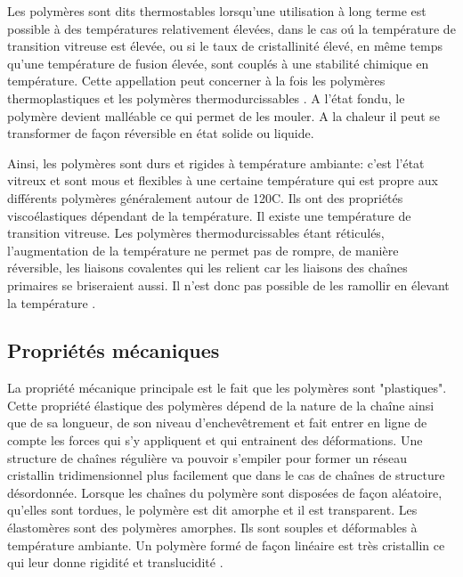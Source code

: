 \par{
Les polym\`eres sont dits thermostables lorsqu'une utilisation \`a long terme est possible \`a des temp\'eratures relativement \'elev\'ees, dans le cas o\'u la temp\'erature de transition vitreuse est \'elev\'ee, ou si le taux de cristallinit\'e \'elev\'e, en m\^eme temps qu'une temp\'erature de fusion \'elev\'ee, sont coupl\'es \`a une stabilit\'e chimique en temp\'erature. Cette appellation peut concerner \`a la fois les polym\`eres thermoplastiques et les polym\`eres thermodurcissables {\citep{domin2013}}. A l'\'etat fondu, le polym\`ere devient mall\'eable ce qui permet de les mouler. A la chaleur il peut se transformer de fa\c con r\'eversible en \'etat solide ou liquide.
}
\par{
Ainsi, les polym\`eres sont durs et rigides \`a temp\'erature ambiante: c'est l'\'etat vitreux et sont mous et flexibles \`a une certaine temp\'erature qui est propre aux diff\'erents polym\`eres g\'en\'eralement autour de 120\degree C. Ils ont des propri\'et\'es visco\'elastiques d\'ependant de la temp\'erature. Il existe une temp\'erature de transition vitreuse. Les polym\`eres thermodurcissables \'etant r\'eticul\'es, l'augmentation de la temp\'erature ne permet pas de rompre, de mani\`ere r\'eversible, les liaisons covalentes qui les relient car les liaisons des cha\^ines primaires se briseraient aussi. Il n'est donc pas possible de les ramollir en \'elevant la temp\'erature {\citep{lecomte2009physique}}.
}

\subsection{Propri\'et\'es m\'ecaniques}
\par{
La propri\'et\'e m\'ecanique principale est le fait que les polym\`eres sont "plastiques". Cette propri\'et\'e \'elastique des polym\`eres d\'epend de la nature de la cha\^ine ainsi que de sa longueur, de son niveau d'enchev\^etrement et fait entrer en ligne de compte les forces qui s'y appliquent et qui entrainent des d\'eformations. Une structure de cha\^ines r\'eguli\`ere va pouvoir s'empiler pour former un r\'eseau cristallin tridimensionnel plus facilement que dans le cas de cha\^ines de structure d\'esordonn\'ee. Lorsque les cha\^ines du polym\`ere sont dispos\'ees de fa\c con al\'eatoire, qu'elles sont tordues, le polym\`ere est dit amorphe et il est transparent. Les \'elastom\`eres sont des polym\`eres amorphes. Ils sont souples et d\'eformables  \`a temp\'erature ambiante. Un polym\`ere form\'e de fa\c con lin\'eaire est tr\`es cristallin ce qui leur donne rigidit\'e et translucidit\'e {\citep{lecomte2009physique}}.
}

